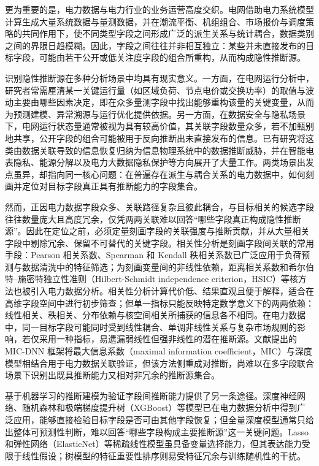 \documentclass[UTF8,zihao=5,twoside]{ctexart}
\numberwithin{equation}{section}
\begin{document}
更为重要的是，电力数据与电力行业的业务运营高度交织。电网借助电力系统模型计算生成大量系统数据与量测数据，并在潮流平衡、机组组合、市场报价与调度策略的共同作用下，使不同类型字段之间形成广泛的派生关系与统计耦合，数据类别之间的界限日趋模糊\cite{ref-xing-micdnn}。因此，字段之间往往并非相互独立：某些并未直接发布的目标字段，可能由若干公开或低关注度字段的组合所重构，从而构成隐性推断源。

识别隐性推断源在多种分析场景中均具有现实意义。一方面，在电网运行分析中，研究者常需厘清某一关键运行量（如区域负荷、节点电价或交换功率）的取值与波动主要由哪些因素决定，即在众多量测字段中找出能够重构该量的关键变量，从而为预测建模、异常溯源与运行优化提供依据\cite{ref-deng-load}。另一方面，在数据安全与隐私场景下，电网运行状态量通常被视为具有较高价值，其关联字段数量众多，若不加甄别地共享，公开字段的组合可能被用于反向推断出未直接发布的信息。已有研究将这类由数据关联导致的信息恢复归纳为信息物理系统中的数据推断威胁\cite{ref-liu-inference}，并在智能电表隐私\cite{ref-sankar,ref-giaconi}、能源分解\cite{ref-adewole}以及电力大数据隐私保护\cite{ref-chen-privacy,ref-zhang-sgcc}等方向展开了大量工作。两类场景出发点虽异，却指向同一核心问题：在普遍存在派生与耦合关系的电力数据中，如何刻画并定位对目标字段真正具有推断能力的字段集合。

然而，正因电力数据字段众多、关联路径复杂且彼此耦合，与目标相关的候选字段往往数量庞大且高度冗余，仅凭两两关联难以回答“哪些字段真正构成隐性推断源”。因此在定位之前，必须定量刻画字段的关联强度与推断贡献，并从大量相关字段中剔除冗余、保留不可替代的关键字段。相关性分析是刻画字段间关联的常用手段：Pearson 相关系数、Spearman 和 Kendall 秩相关系数已广泛应用于负荷预测与数据清洗中的特征筛选\cite{ref-lan-load,ref-jiao-pv,ref-deng-load}；为刻画变量间的非线性依赖，距离相关系数\cite{ref-szekely-dcorr}和希尔伯特--施密特独立性准则（Hilbert-Schmidt independence criterion，HSIC）\cite{ref-gretton-hsic}等核方法也被引入电力数据分析。相关性分析计算代价低、结果直观且便于解释，适合在高维字段空间中进行初步筛查；但单一指标只能反映特定数学意义下的两两依赖：线性相关、秩相关、分布依赖与核空间相关所捕获的信息各不相同。在电力数据中，同一目标字段可能同时受到线性耦合、单调非线性关系与复杂市场规则的影响，若仅采用一种指标，易遗漏弱线性但强非线性的潜在推断源。文献\cite{ref-xing-micdnn}提出的 MIC-DNN 框架将最大信息系数（maximal information coefficient，MIC）\cite{ref-reshef-mic}与深度模型相结合用于电力数据关联验证，但该方法侧重成对推断，尚难以在多字段联合场景下识别出既具推断能力又相对非冗余的推断源集合。

基于机器学习的推断建模为验证字段间推断能力提供了另一条途径。深度神经网络\cite{ref-lecun-deep,ref-goodfellow-deep}、随机森林\cite{ref-breiman-rf}和极端梯度提升树（XGBoost）\cite{ref-chen-xgboost}等模型已在电力数据分析中得到广泛应用\cite{ref-wang-meter}，能够直接检验目标字段是否可由其他字段恢复；但全量深度模型通常只给出整体可预测性判断，难以回答“哪些字段构成主要推断源”这一关键问题。Lasso\cite{ref-tibshirani-lasso}和弹性网络（ElasticNet）\cite{ref-zou-enet}等稀疏线性模型虽具备变量选择能力，但其表达能力受限于线性假设；树模型的特征重要性排序则易受特征冗余与训练随机性的干扰。
\end{document}
